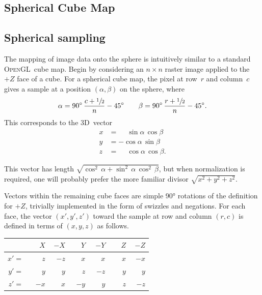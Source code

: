 \documentclass[oneside,10pt]{memoir}
\newcommand{\threed}  {3D}
\newcommand{\opengl}  {\textsc{OpenGL}}
\newcommand{\B}{\bigstrut[b]}
\newcommand{\T}{\bigstrut[t]}
\newcommand{\Pos}[1]{\phantom{-}{#1}}
\newcommand{\Neg}[1]{        {-}{#1}}
\begin{document}




\begin{Spacing}{1.1}





\chapter{Spherical Cube Map}

\section{Spherical sampling}
\label{sec:sampling}

The mapping of image data onto the sphere is intuitively similar to a standard \opengl\ cube map. Begin by considering an $n\times n$ raster image applied to the $+Z$ face of a cube. For a spherical cube map, the pixel at row~$r$ and column~$c$ gives a sample at a position $(\alpha, \beta)$ on the sphere, where
\[\alpha=90^{\circ}\,\frac{c + \sfrac{1}{2}}{n} - 45^{\circ}\qquad\beta=90^{\circ}\,\frac{r + \sfrac{1}{2}}{n} - 45^{\circ}.\]
This corresponds to the \threed\ vector
\begin{align*}
x& = \phantom{-}\sin\alpha\, \cos\beta\\
y& =         {-}\cos\alpha\, \sin\beta\\
z& = \phantom{-}\cos\alpha\, \cos\beta.
\end{align*}

This vector has length \(\sqrt{\cos^2\,\alpha + \sin^2\,\alpha\,\cos^2\,\beta}\), but when normalization is required, one will probably prefer the more familiar divisor \(\sqrt{x^2+y^2+z^2}\).

Vectors within the remaining cube faces are simple \ang{90} rotations of the definition for $+Z$, trivially implemented in the form of swizzles and negations. For each face, the vector $(x', y', z')$ toward the sample at row and column $(r, c)$ is defined in terms of $(x, y, z)$ as follows.
\begin{center}
\begin{tabular}{rr|r|r|r|r|r}
    &$\Pos{X}$&$\Neg{X}$&$\Pos{Y}$&$\Neg{Y}$&$\Pos{Z}$&$\Neg{Z}$\B\\\hline
$x'=$&$\Pos{z}$&$\Neg{z}$&$\Pos{x}$&$\Pos{x}$&$\Pos{x}$&$\Neg{x}$\T\\
$y'=$&$\Pos{y}$&$\Pos{y}$&$\Pos{z}$&$\Neg{z}$&$\Pos{y}$&$\Pos{y}$\\
$z'=$&$\Neg{x}$&$\Pos{x}$&$\Neg{y}$&$\Pos{y}$&$\Pos{z}$&$\Neg{z}$\\
\end{tabular}
\end{center}


\end{Spacing}
\end{document}
